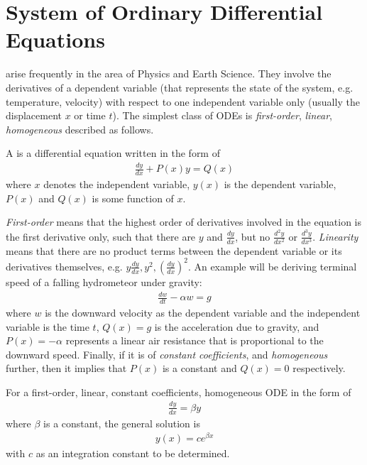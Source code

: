 \section{System of Ordinary Differential Equations}
 arise frequently in the area of Physics and Earth Science. They involve the derivatives of a dependent variable (that represents the state of the system, e.g. temperature, velocity) with respect to one independent variable only (usually the displacement $x$ or time $t$). The simplest class of ODEs is \textit{first-order}, \textit{linear}, \textit{homogeneous} described as follows.
\begin{defn}
A  is a differential equation written in the form of
\begin{align*}
\frac{dy}{dx} + P(x)y = Q(x)
\end{align*}
where $x$ denotes the independent variable, $y(x)$ is the dependent variable, $P(x)$ and $Q(x)$ is some function of $x$. 
\end{defn}
\textit{First-order} means that the highest order of derivatives involved in the equation is the first derivative only, such that there are $y$ and $\frac{dy}{dx}$, but no $\frac{d^2y}{dx^2}$ or $\frac{d^3y}{dx^3}$. \textit{Linearity} means that there are no product terms between the dependent variable or its derivatives themselves, e.g. $y\frac{dy}{dx}, y^2, (\frac{dy}{dx})^2$. An example will be deriving terminal speed of a falling hydrometeor under gravity:
\begin{align*}
\frac{dw}{dt} - \alpha w = g
\end{align*}
where $w$ is the downward velocity as the dependent variable and the independent variable is the time $t$, $Q(x) = g$ is the acceleration due to gravity, and $P(x) = -\alpha$ represents a linear air resistance that is proportional to the downward speed. Finally, if it is of \textit{constant coefficients}, and \textit{homogeneous} further, then it implies that $P(x)$ is a constant and $Q(x) = 0$ respectively.
\begin{proper}
\label{proper:ODEsol}
For a first-order, linear, constant coefficients, homogeneous ODE in the form of
\begin{align*}
\frac{dy}{dx} = \beta y
\end{align*}
where $\beta$ is a constant, the general solution is
\begin{align*}
y(x) = ce^{\beta x}
\end{align*}
with $c$ as an integration constant to be determined. 
\end{proper}
